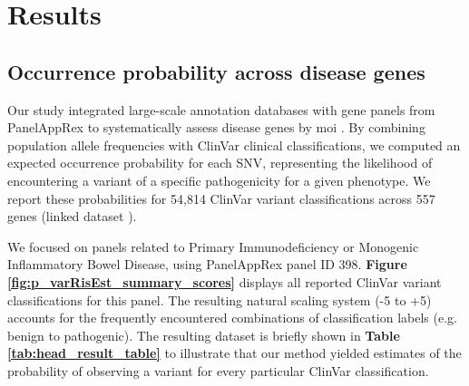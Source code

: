 \section{Results}
\subsection{Occurrence probability across disease genes}
\label{sec:pro_obs}
Our study integrated large-scale annotation databases with gene panels from PanelAppRex to systematically assess disease genes by \ac{moi} 
\cite{lawless_panelapprex_2025}. 
By combining population allele frequencies with ClinVar clinical classifications, we computed an expected occurrence probability for each SNV, representing the likelihood of encountering a variant of a specific pathogenicity for a given phenotype. We report these probabilities for 54,814 ClinVar variant classifications across 557 genes (linked dataset \cite{lawless_2025_15111584}).

We focused on panels related to Primary Immunodeficiency or Monogenic Inflammatory Bowel Disease, using PanelAppRex panel ID 398.
\textbf{Figure \ref{fig:p_varRisEst_summary_scores}} displays all reported ClinVar  variant classifications for this panel. The resulting natural scaling system (-5 to +5) accounts for the frequently encountered combinations of classification labels (e.g. benign to pathogenic).
The resulting dataset \cite{lawless_2025_15111584} is briefly shown in \textbf{Table \ref{tab:head_result_table}} to illustrate that our method yielded estimates of the probability of observing a variant for every particular ClinVar classification. 


